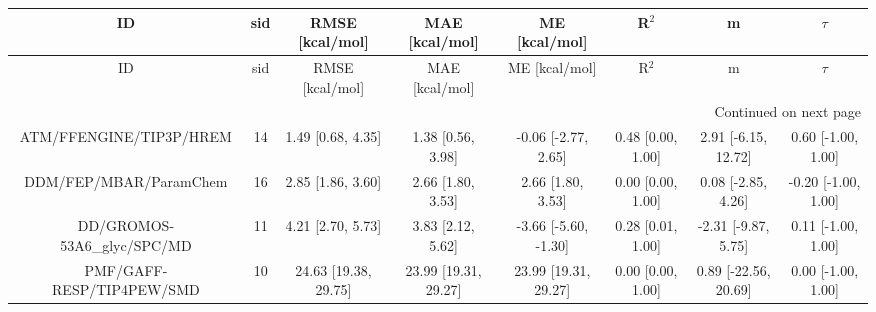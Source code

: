 \documentclass[8pt]{article}
\begin{document}
\begin{center}
\begin{footnotesize}
\begin{longtable}{|cccccccc|}
\toprule
                         ID & sid &      RMSE [kcal/mol] &       MAE [kcal/mol] &        ME [kcal/mol] &             R$^2$ &                    m &              $\tau$ \\
\midrule
\endfirsthead

\toprule
                         ID & sid &      RMSE [kcal/mol] &       MAE [kcal/mol] &        ME [kcal/mol] &             R$^2$ &                    m &              $\tau$ \\
\midrule
\endhead
\midrule
\multicolumn{8}{r}{{Continued on next page}} \\
\midrule
\endfoot

\bottomrule
\endlastfoot
    ATM/FFENGINE/TIP3P/HREM &  14 &    1.49 [0.68, 4.35] &    1.38 [0.56, 3.98] &  -0.06 [-2.77, 2.65] & 0.48 [0.00, 1.00] &  2.91 [-6.15, 12.72] &  0.60 [-1.00, 1.00] \\
     DDM/FEP/MBAR/ParamChem &  16 &    2.85 [1.86, 3.60] &    2.66 [1.80, 3.53] &    2.66 [1.80, 3.53] & 0.00 [0.00, 1.00] &   0.08 [-2.85, 4.26] & -0.20 [-1.00, 1.00] \\
DD/GROMOS-53A6\_glyc/SPC/MD &  11 &    4.21 [2.70, 5.73] &    3.83 [2.12, 5.62] & -3.66 [-5.60, -1.30] & 0.28 [0.01, 1.00] &  -2.31 [-9.87, 5.75] &  0.11 [-1.00, 1.00] \\
  PMF/GAFF-RESP/TIP4PEW/SMD &  10 & 24.63 [19.38, 29.75] & 23.99 [19.31, 29.27] & 23.99 [19.31, 29.27] & 0.00 [0.00, 1.00] & 0.89 [-22.56, 20.69] &  0.00 [-1.00, 1.00] \\
\end{longtable}
\end{footnotesize}
\end{center}
\end{document}
